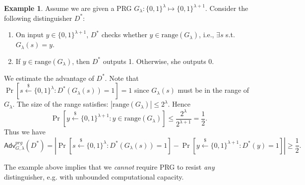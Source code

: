 \documentclass[12pt]{article}
\newcommand{\bits}{\{0,1\}}
\newcommand{\getsr}{\stackrel{\$}{\gets}}
\newcommand{\Adv}{\textsf{Adv}}
\theoremstyle{definition}
\newtheorem{example}[theorem]{Example}
\begin{document}
\begin{example}
\label{eg:2}
Assume we are given a PRG $G_\lambda : \bits^\lambda \mapsto \bits^{\lambda+1}$. Consider the following distinguisher $D^*$: 
\begin{enumerate}
\item On input $y\in \bits^{\lambda+1}$, $D^*$ checks whether $y\in\mathrm{range}(G_\lambda)$, i.e., $\exists s$ s.t. $G_\lambda(s) = y$.
\item If $y\in\mathrm{range}(G_\lambda)$, then $D^*$ outputs 1. Otherwise, she outputs 0.
\end{enumerate}
We estimate the advantage of $D^*$. Note that $\Pr[s\getsr\bits^\lambda: D^*(G_\lambda(s))=1]=1$ since $G_\lambda(s)$ must be in the range of $G_\lambda$. The size of the range satisfies: $|\mathrm{range}(G_\lambda)|\leq 2^{\lambda}$. Hence
$$\Pr[y\getsr \bits^{\lambda+1}: y\in\mathrm{range}(G_\lambda)] \leq \frac{2^\lambda}{2^{\lambda+1}}=\frac{1}{2}.$$
Thus we have
$$\Adv_{G,\lambda}^{prg}(D^*) = \left| \Pr[s\getsr\bits^\lambda: D^*(G_\lambda(s))=1] - \Pr[y\getsr\bits^{\lambda+1}:D^*(y)=1] \right| \geq \frac{1}{2}.$$
\end{example}
The example above implies that we \emph{cannot} require PRG to resist \emph{any} distinguisher, e.g. with unbounded computational capacity.
\end{document}

